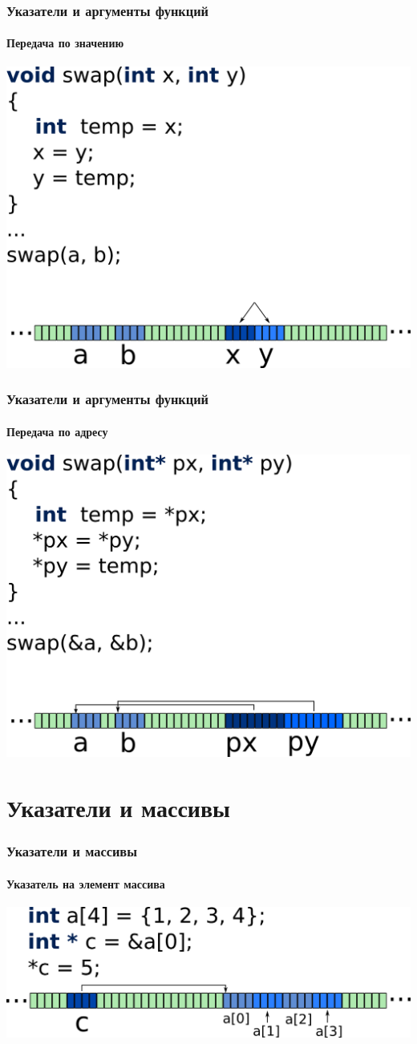 \documentclass[12pt,pdf,hyperref={unicode}]{beamer}
\begin{document}
\begin{frame}[fragile]
\frametitle{Указатели и аргументы функций} 
\framesubtitle{Передача по значению}
\begin{center}
\includegraphics[height=0.55\linewidth]{images/swap_wrong.png}
\end{center}
\end{frame}

\begin{frame}[fragile]
\frametitle{Указатели и аргументы функций} 
\framesubtitle{Передача по адресу}
\begin{center}
\includegraphics[height=0.55\linewidth]{images/swap_right.png}
\end{center}
\end{frame}


\section{Указатели и массивы}

\begin{frame}[fragile]
\frametitle{Указатели и массивы} 
\framesubtitle{Указатель на элемент массива}
\begin{center}
\includegraphics[width=0.95\linewidth]{images/memory_parrays_1.png}
\end{center}
\end{frame}
\end{document}

